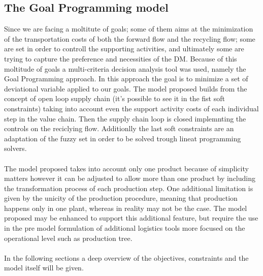 \documentclass{article}
\begin{document}
\subsection{The Goal Programming model}
Since we are facing a moltitute of goals; some of them aims at the minimization of the transportation costs of both the forward flow and the recycling flow; some are set in order to controll the supporting activities, and ultimately some are trying to capture the preference and necessities of the DM.
Because of this moltitude of goals a multi-criteria decision analysis tool was used, namely the Goal Programming approach. In this approach the goal is to minimize a set of deviational variable applied to our goals.
The model proposed builds from the concept of open loop supply chain (it's possible to see it in the fist soft constraints) taking into account even the support activity costs of each individual step in the value chain. Then the supply chain loop is closed implemnting the controls on the reciclying flow. Additionlly the last soft constraints are an adaptation of the fuzzy set in order to be solved trough lineat programming solvers.
\\
\\
The model proposed takes into account only one product because of simplicity matters however it can be adjusted to allow more than one product by including the transformation process of each production step. One additional limitation is given by the unicity of the production procedure, meaning that production happens only in one plant, whereas in reality may not be the case. The model proposed may be enhanced to support this additional feature, but require the use in the pre model formulation of additional logistics tools more focused on the operational level such as production tree.
\\
\\
In the following sections a deep overview of the objectives, constraints and the model itself will be given.
\end{document}
